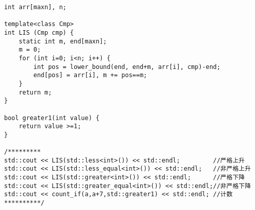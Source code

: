 \begin{lstlisting}
int arr[maxn], n;

template<class Cmp>  
int LIS (Cmp cmp) {  
	static int m, end[maxn];  
	m = 0;  
	for (int i=0; i<n; i++) {  
		int pos = lower_bound(end, end+m, arr[i], cmp)-end;  
		end[pos] = arr[i], m += pos==m;  
	}  
	return m;  
}  

bool greater1(int value) {  
	return value >=1;  
}  

/*********
std::cout << LIS(std::less<int>()) << std::endl;         //严格上升  
std::cout << LIS(std::less_equal<int>()) << std::endl;   //非严格上升  
std::cout << LIS(std::greater<int>()) << std::endl;      //严格下降  
std::cout << LIS(std::greater_equal<int>()) << std::endl;//非严格下降  
std::cout << count_if(a,a+7,std::greater1) << std::endl; //计数  
**********/
\end{lstlisting}